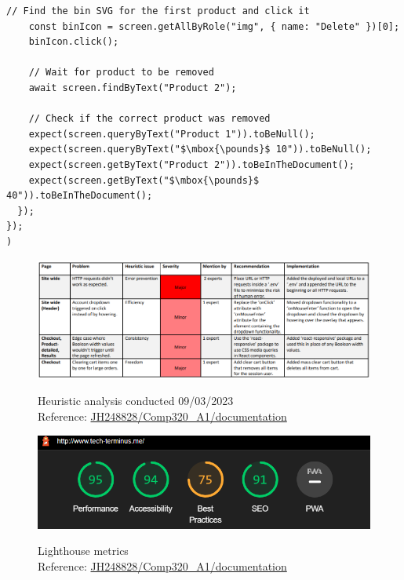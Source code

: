 \documentclass[article]{IEEEtran}
\begin{document}
\begin{lstlisting}[style=jsListingStyle, caption={Cart functionality tests}, captionpos=t, mathescape=true]
    // Find the bin SVG for the first product and click it
    const binIcon = screen.getAllByRole("img", { name: "Delete" })[0];
    binIcon.click();
  
    // Wait for product to be removed
    await screen.findByText("Product 2");
  
    // Check if the correct product was removed
    expect(screen.queryByText("Product 1")).toBeNull();
    expect(screen.queryByText("$\mbox{\pounds}$ 10")).toBeNull();
    expect(screen.getByText("Product 2")).toBeInTheDocument();
    expect(screen.getByText("$\mbox{\pounds}$ 40")).toBeInTheDocument();
  });
});
) \end{lstlisting}   

            \begin{figure}[H]
                \caption{Heuristic analysis conducted 09/03/2023 \\\hspace{\textwidth} Reference: \href{https://github.falmouth.ac.uk/JH248828/Comp320_A1-Comp360_A1/tree/documentation/hueristics}{JH248828/Comp320\_A1/documentation}}
                \includegraphics[width=\columnwidth]{images/testing/heuristic-analysis-block-2.png}
                \label{fig:heuristic-analysis}
            \end{figure}
        
            \begin{figure}[h]
                \caption{Lighthouse metrics \\\hspace{\textwidth} Reference: \href{https://github.falmouth.ac.uk/JH248828/Comp320_A1-Comp360_A1/tree/documentation}{JH248828/Comp320\_A1/documentation}}
                \includegraphics[width=\columnwidth]{images/testing/usability-test.png}
                \label{fig:usability-test}
            \end{figure}
\end{document}
